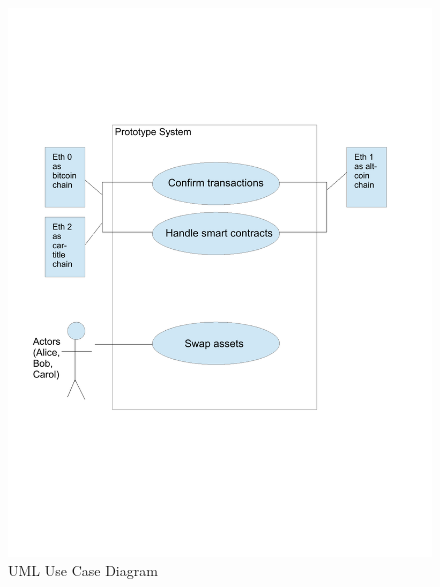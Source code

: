 
\begin{figure}[h]
	\includegraphics[height=1\paperwidth]{uml}	
	\caption{UML Use Case Diagram}
	\label{fig:uml_use_case}
\end{figure}


